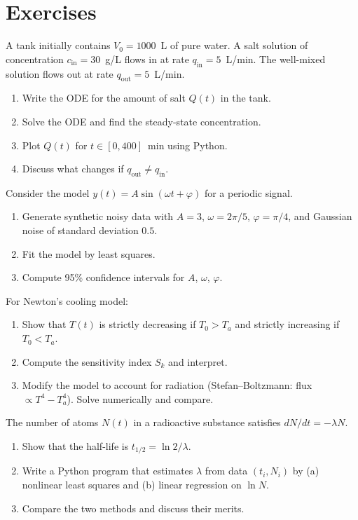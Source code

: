\section{Exercises}

\begin{exercise}
A tank initially contains $V_0=1000$~L of pure water.  A salt solution
of concentration $c_{\mathrm{in}}=30$~g/L flows in at rate
$q_{\mathrm{in}}=5$~L/min.  The well-mixed solution flows out at rate
$q_{\mathrm{out}}=5$~L/min.
\begin{enumerate}
  \item Write the ODE for the amount of salt $Q(t)$ in the tank.
  \item Solve the ODE and find the steady-state concentration.
  \item Plot $Q(t)$ for $t\in[0,400]$~min using Python.
  \item Discuss what changes if $q_{\mathrm{out}}\neq q_{\mathrm{in}}$.
\end{enumerate}
\end{exercise}

\begin{exercise}
Consider the model $y(t)=A\sin(\omega t+\varphi)$ for a periodic signal.
\begin{enumerate}
  \item Generate synthetic noisy data with $A=3$, $\omega=2\pi/5$,
    $\varphi=\pi/4$, and Gaussian noise of standard deviation $0.5$.
  \item Fit the model by least squares.
  \item Compute 95\% confidence intervals for $A$, $\omega$, $\varphi$.
\end{enumerate}
\end{exercise}

\begin{exercise}
For Newton's cooling model:
\begin{enumerate}
  \item Show that $T(t)$ is strictly decreasing if $T_0>T_a$ and
    strictly increasing if $T_0<T_a$.
  \item Compute the sensitivity index $S_k$ and interpret.
  \item Modify the model to account for radiation (Stefan--Boltzmann:
    flux $\propto T^4-T_a^4$).  Solve numerically and compare.
\end{enumerate}
\end{exercise}

\begin{exercise}
The number of atoms $N(t)$ in a radioactive substance satisfies
$dN/dt = -\lambda N$.
\begin{enumerate}
  \item Show that the half-life is $t_{1/2}=\ln 2/\lambda$.
  \item Write a Python program that estimates $\lambda$ from data
    $(t_i,N_i)$ by (a) nonlinear least squares and (b) linear
    regression on $\ln N$.
  \item Compare the two methods and discuss their merits.
\end{enumerate}
\end{exercise}
